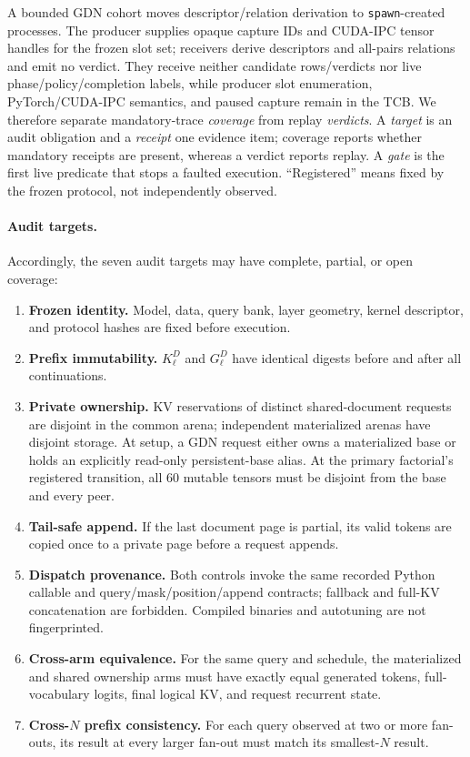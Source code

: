 \documentclass{article}
\begin{document}
A bounded GDN cohort moves descriptor/relation derivation to
\texttt{spawn}-created processes.  The producer supplies opaque capture IDs and
CUDA-IPC tensor handles for the frozen slot set; receivers derive descriptors
and all-pairs relations and emit no verdict.  They receive neither candidate
rows/verdicts nor live phase/policy/completion labels, while producer slot
enumeration, PyTorch/CUDA-IPC semantics, and paused capture remain in the TCB.
We therefore separate mandatory-trace \emph{coverage} from replay
\emph{verdicts}.  A \emph{target} is an audit obligation and a \emph{receipt} one
evidence item; coverage reports whether mandatory receipts are present, whereas
a verdict reports replay.  A \emph{gate} is the first live predicate that stops
a faulted execution.  ``Registered'' means fixed by the frozen protocol, not
independently observed.

\paragraph{Audit targets.}

Accordingly, the seven audit targets may have complete, partial, or open coverage:
\FloatBarrier
\begin{enumerate}
  \setlength{\itemsep}{1pt}
  \setlength{\parskip}{0pt}
  \item \textbf{Frozen identity.}  Model, data, query bank, layer geometry,
  kernel descriptor, and protocol hashes are fixed before execution.
  \item \textbf{Prefix immutability.}  $K^D_\ell$ and $G^D_\ell$ have identical
  digests before and after all continuations.
  \item \textbf{Private ownership.}  KV reservations of distinct
  shared-document requests are disjoint in the common arena; independent
  materialized arenas have disjoint storage.  At setup, a GDN request either
  owns a materialized base or holds an explicitly read-only persistent-base
  alias.  At the primary factorial's registered transition, all 60 mutable tensors must be
  disjoint from the base and every peer.
  \item \textbf{Tail-safe append.}  If the last document page is partial, its
  valid tokens are copied once to a private page before a request appends.
  \item \textbf{Dispatch provenance.}  Both controls invoke the same recorded
  Python callable and query/mask/position/append contracts; fallback and
  full-KV concatenation are forbidden.  Compiled binaries and autotuning are
  not fingerprinted.
  \item \textbf{Cross-arm equivalence.}  For the same query and schedule, the
  materialized and shared ownership arms must have exactly equal generated
  tokens, full-vocabulary logits, final logical KV, and request recurrent
  state.
  \item \textbf{Cross-$N$ prefix consistency.}  For each query observed at two or more
  fan-outs, its result at every larger fan-out must match its smallest-$N$
  result.
\end{enumerate}
\end{document}
